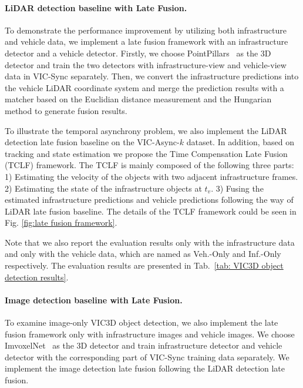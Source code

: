 \paragraph{LiDAR detection baseline with Late Fusion.}
To demonstrate the performance improvement by utilizing both infrastructure and vehicle data, we implement a late fusion framework with an infrastructure detector and a vehicle detector.
Firstly, we choose PointPillars~\cite{lang2019pointpillars} as the 3D detector and train the two detectors with  infrastructure-view and vehicle-view data in VIC-Sync separately.
Then, we convert the infrastructure predictions into the vehicle LiDAR coordinate system and merge the prediction results with a matcher based on the Euclidian distance measurement and the Hungarian method\cite{Kuhn2010TheHM} to generate fusion results. 

To illustrate the temporal asynchrony problem, we also implement the LiDAR detection late fusion baseline on the VIC-Async-$k$ dataset.
In addition, based on tracking and state estimation we propose the Time Compensation Late Fusion (TCLF) framework.
The TCLF is mainly composed of the following three parts: 
1) Estimating the velocity of the objects with two adjacent infrastructure frames. 
2) Estimating the state of the infrastructure objects at $t_{v}$.
3) Fusing the estimated infrastructure predictions and vehicle predictions following the way of LiDAR late fusion baseline.
The details of the TCLF framework could be seen in Fig. \ref{fig:late fusion framework}. 

Note that we also report the evaluation results only with the infrastructure data and only with the vehicle data, which are named as Veh.-Only and Inf.-Only respectively.
The evaluation results are presented in Tab.~\ref{tab: VIC3D object detection results}. 

\paragraph{Image detection baseline with Late Fusion.}
To examine image-only VIC3D object detection, we also implement the late fusion framework only with infrastructure images and vehicle images. 
We choose ImvoxelNet~\cite{rukhovich2021imvoxelnet} as the 3D detector and train infrastructure detector and vehicle detector with the corresponding part of VIC-Sync training data separately.
We implement the image detection late fusion following the LiDAR detection late fusion.

